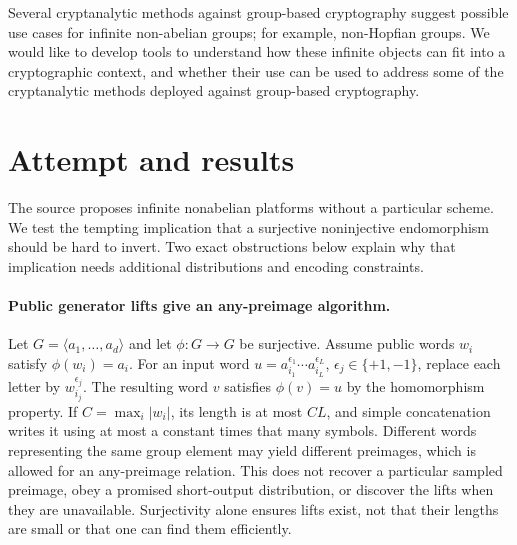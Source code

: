 \documentclass[11pt]{article}
\begin{document}
Several cryptanalytic methods against group-based cryptography suggest possible use cases for infinite non-abelian groups; for example, non-Hopfian groups. We would like to develop tools to understand how these infinite objects can fit into a cryptographic context, and whether their use can be used to address some of the cryptanalytic methods deployed against group-based cryptography.

\section{Attempt and results}
The source proposes infinite nonabelian platforms without a particular scheme.
We test the tempting implication that a surjective noninjective endomorphism
should be hard to invert. Two exact obstructions below explain why that
implication needs additional distributions and encoding constraints.

\paragraph{Public generator lifts give an any-preimage algorithm.}
Let $G=\langle a_1,\ldots,a_d\rangle$ and let $\phi:G\to G$ be surjective.
Assume public words $w_i$ satisfy $\phi(w_i)=a_i$.
For an input word $u=a_{i_1}^{\epsilon_1}\cdots a_{i_L}^{\epsilon_L}$,
$\epsilon_j\in\{+1,-1\}$, replace each letter by $w_{i_j}^{\epsilon_j}$.
The resulting word $v$ satisfies $\phi(v)=u$ by the homomorphism property.
If $C=\max_i|w_i|$, its length is at most $CL$, and simple concatenation
writes it using at most a constant times that many symbols. Different words
representing the same group element may yield different preimages, which is
allowed for an any-preimage relation. This does not recover a particular
sampled preimage, obey a promised short-output distribution, or discover the
lifts when they are unavailable. Surjectivity alone ensures lifts exist, not
that their lengths are small or that one can find them efficiently.
\end{document}
